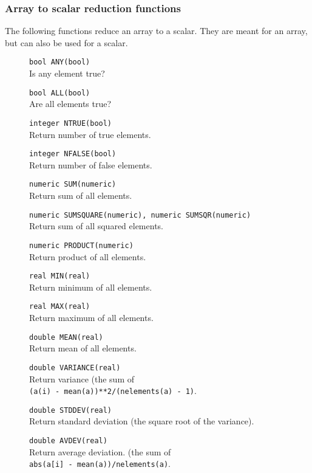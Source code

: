 \subsubsection{Array to scalar reduction functions}
The following functions reduce an array to a scalar.
They are meant for an array, but can also be used for a scalar.
\begin{description}
  \item[] \texttt{bool ANY(bool)}\\
    Is any element true?
  \item[] \texttt{bool ALL(bool)}\\
    Are all elements true?
  \item[] \texttt{integer NTRUE(bool)}\\
    Return number of true elements.
  \item[] \texttt{integer NFALSE(bool)}\\
    Return number of false elements.
  \item[] \texttt{numeric SUM(numeric)}\\
    Return sum of all elements.
  \item[] \texttt{numeric SUMSQUARE(numeric), numeric SUMSQR(numeric)}\\
    Return sum of all squared elements.
  \item[] \texttt{numeric PRODUCT(numeric)}\\
    Return product of all elements.
  \item[] \texttt{real MIN(real)}\\
    Return minimum of all elements.
  \item[] \texttt{real MAX(real)}\\
    Return maximum of all elements.
  \item[] \texttt{double MEAN(real)}\\
    Return mean of all elements.
  \item[] \texttt{double VARIANCE(real)}\\
    Return variance (the sum of
    \\\texttt{(a(i) - mean(a))**2/(nelements(a) - 1)}.
  \item[] \texttt{double STDDEV(real)}\\
    Return standard deviation (the square root of the variance).
  \item[] \texttt{double AVDEV(real)}\\
    Return average deviation. (the sum of
    \\\texttt{abs(a[i] - mean(a))/nelements(a)}.

\end{description}
